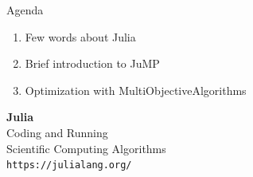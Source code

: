 \documentclass[]{beamer}
\newcommand*{\blue}[1]{\textcolor{nblue}{#1}}
\begin{document}
% 
%
\begin{frame}{Agenda}


\medskip
{
{
\begin{enumerate}
    \item Few words about  \blue{Julia} \vspace{3mm}
    \item Brief introduction to  \blue{JuMP} \vspace{3mm}
    \item Optimization with \blue{MultiObjectiveAlgorithms}
\end{enumerate}
}
}

\end{frame}

% 
%
%


\begin{frame}

\begin{center} 
{\Large \textbf{\Huge{Julia} \vspace{5mm}} \\ Coding and Running \\ Scientific Computing Algorithms \vspace{5mm}\\ \texttt{https://julialang.org/} \\}
\end{center}


\end{frame}
\end{document}
